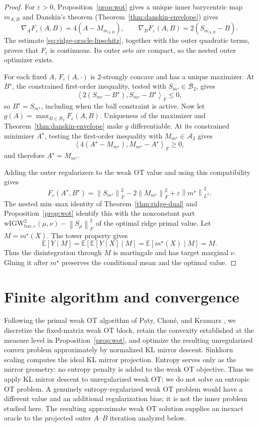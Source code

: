 \documentclass[11pt]{article}
\newcommand{\E}{\mathbb E}
\newcommand{\ip}[2]{\left\langle #1,#2\right\rangle}
\newcommand{\norm}[1]{\left\lVert #1\right\rVert}
\newcommand{\wIGWeps}{\mathrm{wIGW}_{\mathrm{bar},\varepsilon}}
\theoremstyle{plain}
\theoremstyle{definition}
\theoremstyle{remark}
\begin{document}
\begin{proof}
For $\varepsilon>0$, Proposition~\ref{prop:wot} gives a unique inner barycentric
map $m_{A,B}$ and Danskin's theorem
(Theorem~\ref{thm:danskin-envelope}) gives
\[
 \nabla_AF_\varepsilon(A,B)=4(A-M_{m_{A,B}}),\qquad
 \nabla_BF_\varepsilon(A,B)=2(S_{m_{A,B}}-B).
\]
The estimate \eqref{eq:ridge-oracle-lipschitz}, together with the outer
quadratic terms, proves that $F_\varepsilon$ is continuous. Its outer sets are
compact, so the nested outer optimizer exists.

For each fixed $A$, $F_\varepsilon(A,\cdot)$ is $2$-strongly concave and has a
unique maximizer. At $B^\star$, the constrained first-order inequality, tested with
$S_{m^\star}\in\mathcal B_2$, gives
\[
 \ip{2(S_{m^\star}-B^\star)}{S_{m^\star}-B^\star}_F\le0,
\]
so $B^\star=S_{m^\star}$, including when the ball constraint is active. Now let
$g(A)=\max_{B\in\mathcal B_2}F_\varepsilon(A,B)$. Uniqueness of the maximizer
and Theorem~\ref{thm:danskin-envelope} make $g$ differentiable. At its constrained minimizer
$A^\star$, testing the first-order inequality with
$M_{m^\star}\in\mathcal A_2$ gives
\[
 \ip{4(A^\star-M_{m^\star})}{M_{m^\star}-A^\star}_F\ge0,
\]
and therefore $A^\star=M_{m^\star}$.

Adding the outer regularizers to the weak OT value and using this compatibility gives
\[
  F_\varepsilon(A^\star,B^\star)=\norm{S_{m^\star}}_F^2
  -2\norm{M_{m^\star}}_F^2+\varepsilon\norm{m^\star}_{L^2}^2.
\]
The nested min--max identity of Theorem~\ref{thm:ridge-dual} and
Proposition~\ref{prop:wot} identify this with the nonconstant part
\(\wIGWeps^2(\mu,\nu)-\norm{S_\mu}_F^2\) of the optimal ridge primal value. Let
\(M=m^\star(X)\). The tower property gives
\[
  \E[Y\mid M]=\E[\E[Y\mid X]\mid M]=\E[m^\star(X)\mid M]=M.
\]
Thus the disintegration through \(M\) is martingale and has target marginal \(\nu\).
Gluing it after \(m^\star\) preserves the conditional mean and the optimal value.
\end{proof}

\section{Finite algorithm and convergence}\label{sec:algorithm}

Following the primal weak OT algorithm of Paty, Chon\'e, and Kramarz
\cite{PatyChoneKramarz2022}, we discretize the fixed-matrix weak OT block, retain
the convexity established at the measure level in Proposition~\ref{prop:wot}, and
optimize the resulting unregularized convex problem approximately by normalized
KL mirror descent. Sinkhorn scaling computes the ideal KL mirror projection. Entropy
serves only as the mirror geometry: no entropy penalty is added to the weak OT
objective. Thus we apply KL mirror descent to unregularized weak OT; we do not solve
an entropic OT problem. A genuinely entropy-regularized weak OT problem would have
a different value and an additional
regularization bias; it is not the inner problem studied here. The resulting
approximate weak OT solution supplies an inexact oracle to the projected outer
\(A\)--\(B\) iteration analyzed below.
\end{document}
